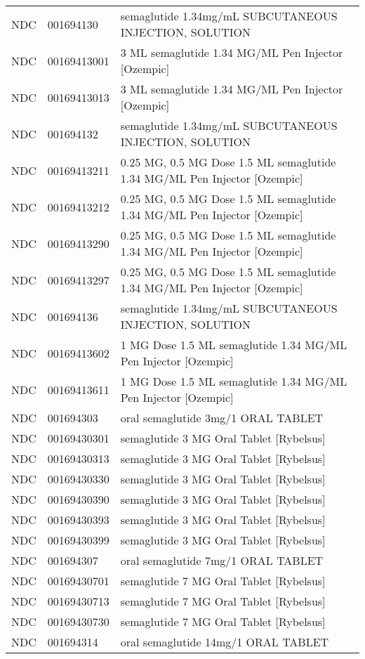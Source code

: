 \begin{longtable}{p{}p{}p{}}
  NDC & 001694130 & semaglutide 1.34mg/mL SUBCUTANEOUS INJECTION, SOLUTION \\ 
  NDC & 00169413001 & 3 ML semaglutide 1.34 MG/ML Pen Injector [Ozempic] \\ 
  NDC & 00169413013 & 3 ML semaglutide 1.34 MG/ML Pen Injector [Ozempic] \\ 
  NDC & 001694132 & semaglutide 1.34mg/mL SUBCUTANEOUS INJECTION, SOLUTION \\ 
  NDC & 00169413211 & 0.25 MG, 0.5 MG Dose 1.5 ML semaglutide 1.34 MG/ML Pen Injector [Ozempic] \\ 
  NDC & 00169413212 & 0.25 MG, 0.5 MG Dose 1.5 ML semaglutide 1.34 MG/ML Pen Injector [Ozempic] \\ 
  NDC & 00169413290 & 0.25 MG, 0.5 MG Dose 1.5 ML semaglutide 1.34 MG/ML Pen Injector [Ozempic] \\ 
  NDC & 00169413297 & 0.25 MG, 0.5 MG Dose 1.5 ML semaglutide 1.34 MG/ML Pen Injector [Ozempic] \\ 
  NDC & 001694136 & semaglutide 1.34mg/mL SUBCUTANEOUS INJECTION, SOLUTION \\ 
  NDC & 00169413602 & 1 MG Dose 1.5 ML semaglutide 1.34 MG/ML Pen Injector [Ozempic] \\ 
  NDC & 00169413611 & 1 MG Dose 1.5 ML semaglutide 1.34 MG/ML Pen Injector [Ozempic] \\ 
  NDC & 001694303 & oral semaglutide 3mg/1 ORAL TABLET \\ 
  NDC & 00169430301 & semaglutide 3 MG Oral Tablet [Rybelsus] \\ 
  NDC & 00169430313 & semaglutide 3 MG Oral Tablet [Rybelsus] \\ 
  NDC & 00169430330 & semaglutide 3 MG Oral Tablet [Rybelsus] \\ 
  NDC & 00169430390 & semaglutide 3 MG Oral Tablet [Rybelsus] \\ 
  NDC & 00169430393 & semaglutide 3 MG Oral Tablet [Rybelsus] \\ 
  NDC & 00169430399 & semaglutide 3 MG Oral Tablet [Rybelsus] \\ 
  NDC & 001694307 & oral semaglutide 7mg/1 ORAL TABLET \\ 
  NDC & 00169430701 & semaglutide 7 MG Oral Tablet [Rybelsus] \\ 
  NDC & 00169430713 & semaglutide 7 MG Oral Tablet [Rybelsus] \\ 
  NDC & 00169430730 & semaglutide 7 MG Oral Tablet [Rybelsus] \\ 
  NDC & 001694314 & oral semaglutide 14mg/1 ORAL TABLET \\ 

\end{longtable}

